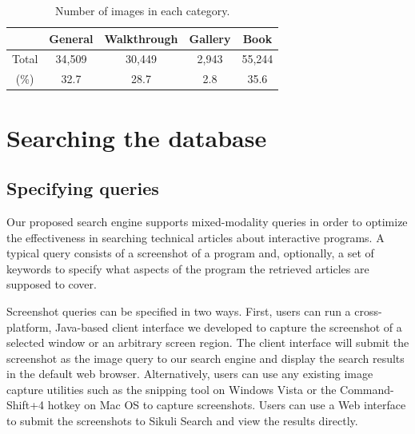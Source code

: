 \documentclass{www2010-submission}
\begin{document}
\begin{table}
\centering \caption{Number of images in each category.}
\label{tbl:category_distribution}

\begin{tabular}{|c|c|c|c|c|}
\hline
      & General & Walkthrough & Gallery & Book \\
\hline
Total & 34,509 & 30,449 & 2,943 & 55,244\\
 \hline
(\%)  & 32.7 & 28.7 & 2.8 & 35.6 \\
\hline
\end{tabular}

\end{table}





\section{Searching the database}

\subsection{Specifying queries}

Our proposed search engine supports mixed-modality queries in order to
optimize the effectiveness in searching technical articles about
interactive programs. A typical query consists of a screenshot of a
program and, optionally, a set of keywords to specify what aspects of
the program the retrieved articles are supposed to cover.

Screenshot queries can be specified in two ways. First, users can
run a cross-platform, Java-based client interface we developed to
capture the screenshot of a selected window or an arbitrary screen
region. The client interface will submit the screenshot as the
image query to our search engine and display the search results in the
default web browser. Alternatively, users can use any existing
image capture utilities such as the snipping tool on Windows Vista
or the Command-Shift+4 hotkey on Mac OS to capture screenshots.
Users can use a Web interface to submit the screenshots to Sikuli
Search and view the results directly.
\end{document}
